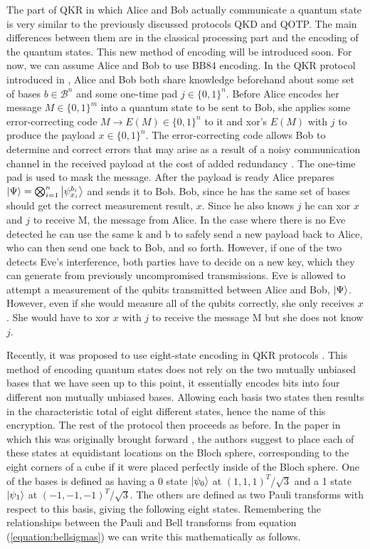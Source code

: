 \documentclass[]{article}
\begin{document}
The part of QKR in which Alice and Bob actually communicate a quantum state is very similar to the previously discussed protocols QKD and QOTP. The main differences between them are in the classical processing part and the encoding of the quantum states. This new method of encoding will be introduced soon. For now, we can assume Alice and Bob to use BB84 encoding. In the QKR protocol introduced in \cite{Leermakers2019}, Alice and Bob both share knowledge beforehand about some set of bases $b \in \mathcal{B}^n$  and some one-time pad $j \in \{0,1\}^n$. Before Alice encodes her message $M \in \{0,1\}^m$ into a quantum state to be sent to Bob, she applies some error-correcting code $M \rightarrow E(M) \in \{0,1\}^n$ to it and xor's $E(M)$ with $j$ to produce the payload $x \in \{0,1\}^n$. The error-correcting code allows Bob to determine and correct errors that may arise as a result of a noisy communication channel in the received payload at the cost of added redundancy \cite{Knill1997}. The one-time pad is used to mask the message. After the payload is ready Alice prepares $\ket{\Psi} = \bigotimes_{i=1}^n \ket{\psi_{x_i}^{b_i}}$ and sends it to Bob. Bob, since he has the same set of bases should get the correct measurement result, $x$. Since he also knows $j$ he can xor $x$ and $j$ to receive M, the message from Alice. In the case where there is no Eve detected he can use the same k and b to safely send a new payload back to Alice, who can then send one back to Bob, and so forth. However, if one of the two detects Eve's interference, both parties have to decide on a new key, which they can generate from previously uncompromised transmissions. Eve is allowed to attempt a measurement of the qubits transmitted between Alice and Bob, $\ket{\Psi}$. However, even if she would measure all of the qubits correctly, she only receives $x$. She would have to xor $x$ with $j$ to receive the message M but she does not know $j$.

Recently, it was proposed to use eight-state encoding in QKR protocols \cite{DeVries2016}. This method of encoding quantum states does not rely on the two mutually unbiased bases that we have seen up to this point, it essentially encodes bits into four different non mutually unbiased bases. Allowing each basis two states then results in the characteristic total of eight different states, hence the name of this encryption. The rest of the protocol then proceeds as before. In the paper in which this was originally brought forward \cite{DeVries2016}, the authors suggest to place each of these states at equidistant locations on the Bloch sphere, corresponding to the eight corners of a cube if it were placed perfectly inside of the Bloch sphere. One of the bases is defined as having a 0 state $\ket{\psi_{0}}$ at $(1,1,1)^T$/$\sqrt{3}$ and a 1 state $\ket{\psi_{1}}$ at $(-1,-1,-1)^T$/$\sqrt{3}$. The others are defined as two Pauli transforms with respect to this basis, giving the following eight states. Remembering the relationships between the Pauli and Bell transforms from equation (\ref{equation:bellsigmas}) we can write this mathematically as follows.
\end{document}

